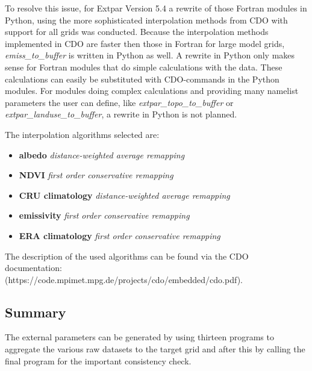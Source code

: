 \documentclass[a4paper,10pt,DIV14,BCOR1cm,titlepage,twoside]{scrartcl}
\begin{document}
\noindent To resolve this issue, for Extpar Version 5.4 a rewrite of those Fortran modules in Python, using the more sophisticated interpolation methods
from CDO with support for all grids was conducted.  Because the interpolation methods implemented in CDO are faster then those
in Fortran for large model grids, \textit{emiss\_to\_buffer} is written in Python as well. A rewrite in Python only makes sense for Fortran modules that do simple calculations with the data. These calculations can easily be substituted with CDO-commands in the Python modules.
For modules doing complex calculations and providing many namelist parameters the user can define, like \textit{extpar\_topo\_to\_buffer} or \textit{extpar\_landuse\_to\_buffer}, a rewrite in Python is not planned.
\par\medskip\noindent

\noindent The interpolation algorithms selected are:

\begin{itemize}
\item \textbf{albedo} \textit{distance-weighted average remapping}
\item \textbf{NDVI} \textit{first order conservative remapping}
\item \textbf{CRU climatology} \textit{distance-weighted average remapping}
\item \textbf{emissivity} \textit{first order conservative remapping}
\item \textbf{ERA climatology} \textit{first order conservative remapping}
\end{itemize}

The description of the used algorithms can be found via the CDO
documentation: 
\\
(https://code.mpimet.mpg.de/projects/cdo/embedded/cdo.pdf).
\\



\subsection{Summary}\label{Summary}
The external parameters can be generated by using thirteen programs to aggregate the various raw datasets to the target grid and after this by calling the final program for the important consistency check.
\end{document}
